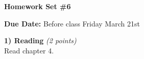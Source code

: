 

\def\xyprime{\ensuremath{\begin{pmatrix} x' \\ y' \end{pmatrix}}}



\thispagestyle{fancy}






\begin{center}
{\huge \textbf{Homework Set \#6}}
\large

{\textbf{ Due Date:} Before class Friday March 21st  }
\end{center}

\textbf{1) Reading } \hfill \textit{(2 points)}\\
Read chapter 4.

\vspace*{0.25in}


